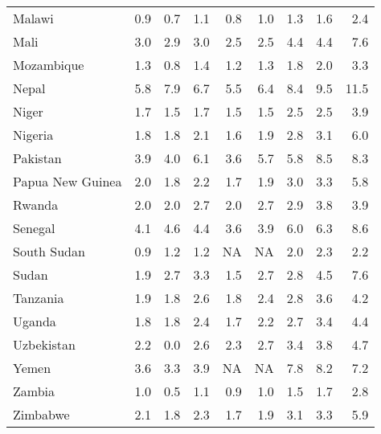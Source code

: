 \begin{table}[b]
{\begin{tabular}[t]{lrrrrrrrr}
Malawi & 0.9 & 0.7 & 1.1 & 0.8 & 1.0 & 1.3 & 1.6 & 2.4\\
Mali & 3.0 & 2.9 & 3.0 & 2.5 & 2.5 & 4.4 & 4.4 & 7.6\\
Mozambique & 1.3 & 0.8 & 1.4 & 1.2 & 1.3 & 1.8 & 2.0 & 3.3\\
Nepal & 5.8 & 7.9 & 6.7 & 5.5 & 6.4 & 8.4 & 9.5 & 11.5\\
Niger & 1.7 & 1.5 & 1.7 & 1.5 & 1.5 & 2.5 & 2.5 & 3.9\\
Nigeria & 1.8 & 1.8 & 2.1 & 1.6 & 1.9 & 2.8 & 3.1 & 6.0\\
Pakistan & 3.9 & 4.0 & 6.1 & 3.6 & 5.7 & 5.8 & 8.5 & 8.3\\
Papua New Guinea & 2.0 & 1.8 & 2.2 & 1.7 & 1.9 & 3.0 & 3.3 & 5.8\\
Rwanda & 2.0 & 2.0 & 2.7 & 2.0 & 2.7 & 2.9 & 3.8 & 3.9\\
Senegal & 4.1 & 4.6 & 4.4 & 3.6 & 3.9 & 6.0 & 6.3 & 8.6\\
South Sudan & 0.9 & 1.2 & 1.2 & NA & NA & 2.0 & 2.3 & 2.2\\
Sudan & 1.9 & 2.7 & 3.3 & 1.5 & 2.7 & 2.8 & 4.5 & 7.6\\
Tanzania & 1.9 & 1.8 & 2.6 & 1.8 & 2.4 & 2.8 & 3.6 & 4.2\\
Uganda & 1.8 & 1.8 & 2.4 & 1.7 & 2.2 & 2.7 & 3.4 & 4.4\\
Uzbekistan & 2.2 & 0.0 & 2.6 & 2.3 & 2.7 & 3.4 & 3.8 & 4.7\\
Yemen & 3.6 & 3.3 & 3.9 & NA & NA & 7.8 & 8.2 & 7.2\\
Zambia & 1.0 & 0.5 & 1.1 & 0.9 & 1.0 & 1.5 & 1.7 & 2.8\\
Zimbabwe & 2.1 & 1.8 & 2.3 & 1.7 & 1.9 & 3.1 & 3.3 & 5.9\\
\bottomrule
\end{tabular}}
\end{table}